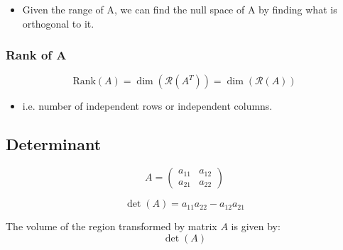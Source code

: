 \begin{example}
    \begin{itemize}
        \item Given the range of A, we can find the null space of A by finding what is orthogonal to it. 
    \end{itemize}
\end{example}

\subsubsection{Rank of A}
\begin{definition}
    \begin{equation*}
        \text{Rank}(A) = \dim(\mathcal{R}(A^T)) = \dim(\mathcal{R}(A)) 
    \end{equation*}
    \begin{itemize}
        \item i.e. number of independent rows or independent columns. 
    \end{itemize}
\end{definition}

\subsection{Determinant}
\begin{definition}
    \begin{equation}
    A = \begin{pmatrix} a_{11} & a_{12} \\ a_{21} & a_{22} \end{pmatrix}
    \end{equation}

    \begin{equation}
    \det(A) = a_{11}a_{22} - a_{12}a_{21}
    \end{equation}

    The volume of the region transformed by matrix $A$ is given by:
    \begin{equation}
    \det(A)
    \end{equation}
\end{definition}

